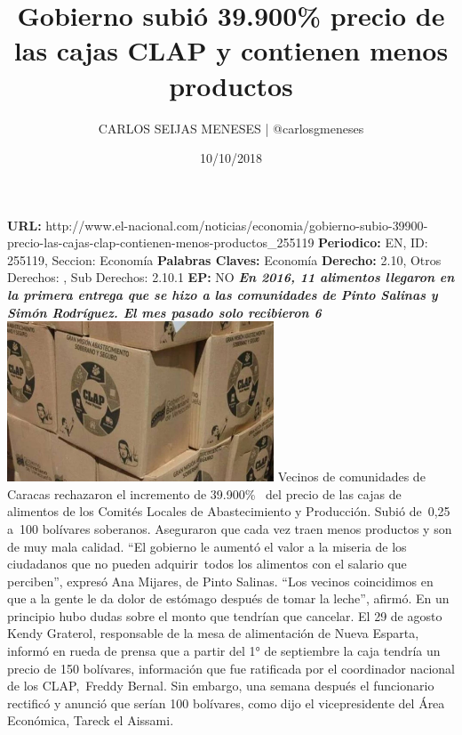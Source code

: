 \documentclass{article}%
\title{\textbf{Gobierno subió 39.900\% precio de las cajas CLAP y contienen menos productos}}%
\author{CARLOS SEIJAS MENESES | @carlosgmeneses}%
\date{10/10/2018}%
\begin{document}
%
\normalsize%
\maketitle%
\textbf{URL: }%
http://www.el{-}nacional.com/noticias/economia/gobierno{-}subio{-}39900{-}precio{-}las{-}cajas{-}clap{-}contienen{-}menos{-}productos\_255119\newline%
%
\textbf{Periodico: }%
EN, %
ID: %
255119, %
Seccion: %
Economía\newline%
%
\textbf{Palabras Claves: }%
Economía\newline%
%
\textbf{Derecho: }%
2.10, %
Otros Derechos: %
, %
Sub Derechos: %
2.10.1\newline%
%
\textbf{EP: }%
NO\newline%
\newline%
%
\textbf{\textit{En 2016, 11 alimentos llegaron en la primera entrega que se hizo a las comunidades de Pinto Salinas y Simón Rodríguez. El mes pasado solo recibieron 6}}%
\newline%
\newline%
%
\includegraphics[width=300px]{240.jpg}%
\newline%
%
Vecinos de comunidades de Caracas rechazaron el incremento de 39.900\% ~del precio de las cajas de alimentos de los Comités Locales de Abastecimiento y Producción. Subió de~0,25 a~100 bolívares soberanos. Aseguraron que cada vez traen menos productos y son de muy mala calidad. “El gobierno le aumentó el valor a la miseria de los ciudadanos que no pueden adquirir~todos los alimentos con el salario que perciben”, expresó Ana Mijares, de Pinto Salinas. “Los vecinos coincidimos en que a la gente le da dolor de estómago después de tomar la leche”, afirmó.%
\newline%
%
En un principio hubo dudas sobre el monto que tendrían que cancelar. El 29 de agosto Kendy Graterol, responsable de la mesa de alimentación de Nueva Esparta, informó en rueda de prensa que a partir del 1° de septiembre la caja tendría un precio de 150 bolívares, información que fue ratificada por el coordinador nacional de los CLAP,~Freddy Bernal. Sin embargo, una semana después el funcionario rectificó y anunció que serían 100 bolívares, como dijo el vicepresidente del Área Económica, Tareck el Aissami.%
\end{document}
